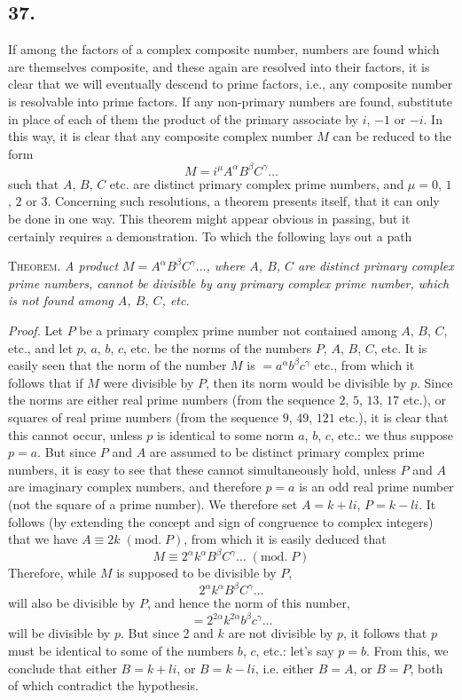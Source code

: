 \documentclass[twoside,12pt]{memoir}
\renewcommand{\pmod}[1]{\;(\textrm{mod.}\;#1)}
\begin{document}
\subsection*{37.}

If among the factors of a complex composite number, numbers are found which are themselves composite, and these again are resolved into their factors, it is clear that we will eventually descend to prime factors, i{.}e{.}, any composite number is resolvable into prime factors. If any non-primary numbers are found, substitute \pagebreak%
in place of each of them the product of the primary associate by \(i\), \(-1\) or \(-i\). In this way, it is clear that any composite complex number \(M\) can be reduced to the form
\[M=i^{\mu} A^{\alpha} B^{\beta} C^{\gamma} \ldots\]
such that \(A\), \(B\), \(C\) etc{.} are distinct primary complex prime numbers, and \(\mu=0\), \(1\), \(2\) or \(3\). Concerning such resolutions, a theorem presents itself, that it can only be done in one way.  This theorem might appear obvious in passing, but it certainly requires a demonstration. To which the following lays out a path

\textsc{Theorem.} \textit{A product \(M=A^{\alpha} B^{\beta} C^{\gamma} \ldots\), where \(A\), \(B\), \(C\) are distinct primary complex prime numbers, cannot be divisible by any primary complex prime number, which is not found among \(A\), \(B\), \(C\), etc{.}}
 
\textit{Proof.} Let \(P\) be a primary complex prime number not contained among \(A\), \(B\), \(C\), etc{.}, and let \(p\), \(a\), \(b\), \(c\), etc{.} be the norms of the numbers \(P\), \(A\), \(B\), \(C\), etc{.} It is easily seen that the norm of the number \(M\) is \(=a^{\alpha} b^{\beta} c^{\gamma}\) etc{.}, from which it follows that if \(M\) were divisible by \({P}\), then its norm would be divisible by \(p\). Since the norms are either real prime numbers (from the sequence \(2\), \(5\), \(13\), \(17\) etc{.}), or squares of real prime numbers (from the sequence \(9\), \(49\), \(121\) etc{.}), it is clear that this cannot occur, unless \(p\) is identical to some norm \(a\), \(b\), \(c\), etc{.}: we thus suppose \(p=a\). But since \(P\) and \(A\) are assumed to be distinct primary complex prime numbers, it is easy to see that these cannot simultaneously hold, unless \(P\) and \(A\) are imaginary complex numbers, and therefore \(p=a\) is an odd real prime number (not the square of a prime number).  We therefore set \(A=k+l i\), \(P=k-l i\).  It follows (by extending the concept and sign of congruence to complex integers) that we have \(A \equiv 2 k\pmod{P}\), from which it is easily deduced that
\[M \equiv 2^{\alpha} k^{\alpha} B^{\beta} C^{\gamma} \ldots\pmod{P}\]
Therefore, while \(M\) is supposed to be divisible by \(P\),
\[2^{\alpha} k^{\alpha} B^{\beta} C^{\gamma} \ldots\]
will also be divisible by \(P\), and hence the norm of this number,
\[=2^{2 \alpha} k^{2 \alpha} b^{\beta} c^{\gamma} \ldots\]
will be divisible by \(p\). But since 2 and \(k\) are not divisible by \(p\), it follows \pagebreak%
that \(p\) must be identical to some of the numbers \(b\), \(c\), etc{.}: let's say \(p=b\). From this, we conclude that either \(B=k+l i\), or \(B=k-l i\), i{.}e{.} either \(B=A\), or \(B=P\), both of which contradict the hypothesis.
 
\end{document}

